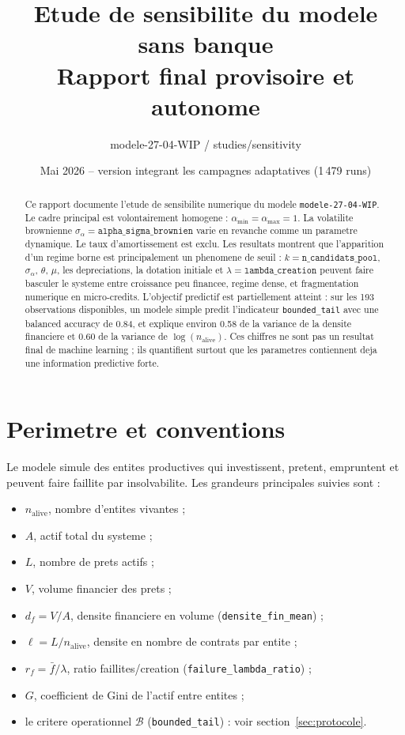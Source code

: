 \documentclass[11pt,a4paper]{article}
\title{Etude de sensibilite du modele sans banque\\Rapport final provisoire et autonome}
\author{modele-27-04-WIP / studies/sensitivity}
\date{Mai 2026 -- version integrant les campagnes adaptatives (1\,479 runs)}
\begin{document}
\maketitle

\begin{abstract}
Ce rapport documente l'etude de sensibilite numerique du modele
\texttt{modele-27-04-WIP}. Le cadre principal est volontairement homogene :
\(\alpha_{\min}=\alpha_{\max}=1\). La volatilite brownienne
\(\sigma_\alpha=\texttt{alpha\_sigma\_brownien}\) varie en revanche comme un
parametre dynamique. Le taux d'amortissement est exclu. Les resultats montrent
que l'apparition d'un regime borne est principalement un phenomene de seuil :
\(k=\texttt{n\_candidats\_pool}\), \(\sigma_\alpha\), \(\theta\), \(\mu\),
les depreciations, la dotation initiale et \(\lambda=\texttt{lambda\_creation}\)
peuvent faire basculer le systeme entre croissance peu financee, regime dense,
et fragmentation numerique en micro-credits. L'objectif predictif est
partiellement atteint : sur les 193 observations disponibles, un modele simple
predit l'indicateur \texttt{bounded\_tail} avec une balanced accuracy de
0.84, et explique environ 0.58 de la variance de la densite financiere et
0.60 de la variance de \(\log(n_{\mathrm{alive}})\). Ces chiffres ne sont pas
un resultat final de machine learning ; ils quantifient surtout que les
parametres contiennent deja une information predictive forte.
\end{abstract}

\section{Perimetre et conventions}

Le modele simule des entites productives qui investissent, pretent, empruntent
et peuvent faire faillite par insolvabilite. Les grandeurs principales suivies
sont :
\begin{itemize}
  \item \(n_{\mathrm{alive}}\), nombre d'entites vivantes ;
  \item \(A\), actif total du systeme ;
  \item \(L\), nombre de prets actifs ;
  \item \(V\), volume financier des prets ;
  \item \(d_f = V/A\), densite financiere en volume (\texttt{densite\_fin\_mean}) ;
  \item \(\ell = L/n_{\mathrm{alive}}\), densite en nombre de contrats par entite ;
  \item \(r_f = \bar{f}/\lambda\), ratio faillites/creation (\texttt{failure\_lambda\_ratio}) ;
  \item \(G\), coefficient de Gini de l'actif entre entites ;
  \item le critere operationnel \(\mathcal{B}\) (\texttt{bounded\_tail}) : voir section~\ref{sec:protocole}.
\end{itemize}
\end{document}

